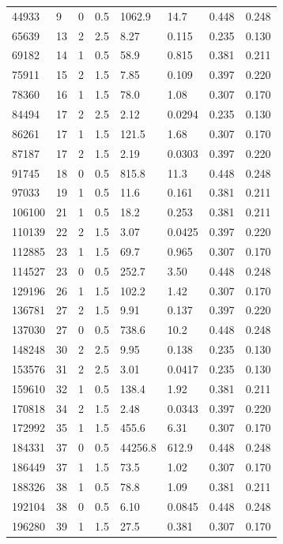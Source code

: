 \documentclass[preview]{standalone}
\begin{document}
{{\begin{tabular}{L{1.2cm}C{1.2cm} C{0.3cm}C{0.5cm} C{1.4cm}C{1.4cm} C{1.4cm}C{1.4cm}}
  44933  &     9  & 0     & 0.5 &  1062.9  & 14.7  & 0.448 &  0.248   \\ 
  65639  &    13  & 2     & 2.5 &  8.27  & 0.115  & 0.235 &  0.130   \\ 
  69182  &    14  & 1     & 0.5 &  58.9  & 0.815  & 0.381 &  0.211   \\ 
  75911  &    15  & 2     & 1.5 &  7.85  & 0.109  & 0.397 &  0.220   \\ 
  78360  &    16  & 1     & 1.5 &  78.0  & 1.08  & 0.307 &  0.170   \\ 
  84494  &    17  & 2     & 2.5 &  2.12  & 0.0294  & 0.235 &  0.130   \\ 
  86261  &    17  & 1     & 1.5 &  121.5  & 1.68  & 0.307 &  0.170   \\ 
  87187  &    17  & 2     & 1.5 &  2.19  & 0.0303  & 0.397 &  0.220   \\ 
  91745  &    18  & 0     & 0.5 &  815.8  & 11.3  & 0.448 &  0.248   \\ 
  97033  &    19  & 1     & 0.5 &  11.6  & 0.161  & 0.381 &  0.211   \\ 
  106100  &    21  & 1     & 0.5 &  18.2  & 0.253  & 0.381 &  0.211   \\ 
  110139  &    22  & 2     & 1.5 &  3.07  & 0.0425  & 0.397 &  0.220   \\ 
  112885  &    23  & 1     & 1.5 &  69.7  & 0.965  & 0.307 &  0.170   \\ 
  114527  &    23  & 0     & 0.5 &  252.7  & 3.50  & 0.448 &  0.248   \\ 
  129196  &    26  & 1     & 1.5 &  102.2  & 1.42  & 0.307 &  0.170   \\ 
  136781  &    27  & 2     & 1.5 &  9.91  & 0.137  & 0.397 &  0.220   \\ 
  137030  &    27  & 0     & 0.5 &  738.6  & 10.2  & 0.448 &  0.248   \\ 
  148248  &    30  & 2     & 2.5 &  9.95  & 0.138  & 0.235 &  0.130   \\ 
  153576  &    31  & 2     & 2.5 &  3.01  & 0.0417  & 0.235 &  0.130   \\ 
  159610  &    32  & 1     & 0.5 &  138.4  & 1.92  & 0.381 &  0.211   \\ 
  170818  &    34  & 2     & 1.5 &  2.48  & 0.0343  & 0.397 &  0.220   \\ 
  172992  &    35  & 1     & 1.5 &  455.6  & 6.31  & 0.307 &  0.170   \\ 
  184331  &    37  & 0     & 0.5 &  44256.8  & 612.9  & 0.448 &  0.248   \\ 
  186449  &    37  & 1     & 1.5 &  73.5  & 1.02  & 0.307 &  0.170   \\ 
  188326  &    38  & 1     & 0.5 &  78.8  & 1.09  & 0.381 &  0.211   \\ 
  192104  &    38  & 0     & 0.5 &  6.10  & 0.0845  & 0.448 &  0.248   \\ 
  196280  &    39  & 1     & 1.5 &  27.5  & 0.381  & 0.307 &  0.170   \\ 
\hline 
\end{tabular} 

}}
\end{document}
